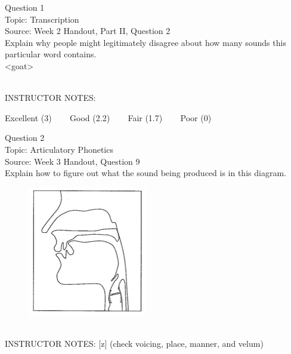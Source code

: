 \documentclass[12pt]{article}
\begin{document}
\begin{center}
\textbf{{\color{blue}{\HUGE START OF EXAM\\}}}

\textbf{{\color{blue}{\HUGE Student ID: 15082\\}}}

\textbf{{\color{blue}{\HUGE \\}}}

\end{center}
\newpage

{\large Question 1}\\

Topic: Transcription\\
Source: Week 2 Handout, Part II, Question 2\\

Explain why people might legitimately disagree about how many sounds this particular word contains.\\

<goat>


~\\
INSTRUCTOR NOTES: 


\vfill
Excellent (3) ~~~ Good (2.2) ~~~ Fair (1.7) ~~~ Poor (0)
\newpage

{\large Question 2}\\

Topic: Articulatory Phonetics\\
Source: Week 3 Handout, Question 9\\

Explain how to figure out what the sound being produced is in this diagram.\\

\begin{figure}[H]
\includegraphics{../images/sagittal_z.png}
\end{figure}

~\\
INSTRUCTOR NOTES: [z] (check voicing, place, manner, and velum)
\end{document}
